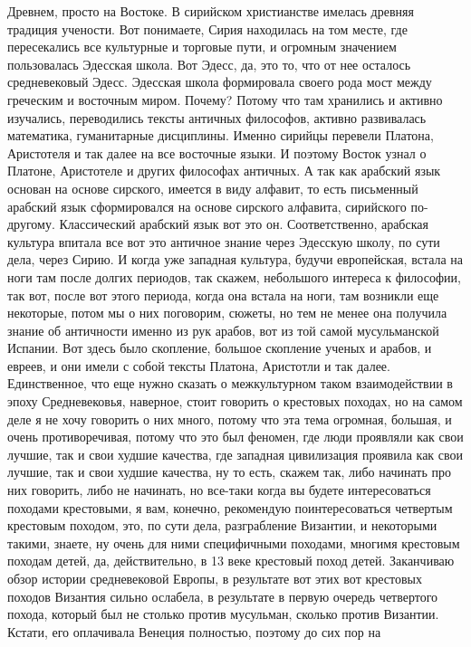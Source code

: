 Древнем, просто на Востоке. В сирийском христианстве имелась древняя традиция
учености. Вот понимаете, Сирия находилась на том месте, где пересекались все
культурные и торговые пути, и огромным значением пользовалась Эдесская школа.
Вот Эдесс, да, это то, что от нее осталось средневековый Эдесс. Эдесская школа
формировала своего рода мост между греческим и восточным миром. Почему? Потому
что там хранились и активно изучались, переводились тексты античных философов,
активно развивалась математика, гуманитарные дисциплины. Именно сирийцы перевели
Платона, Аристотеля и так далее на все восточные языки. И поэтому Восток узнал о
Платоне, Аристотеле и других философах античных. А так как арабский язык основан
на основе сирского, имеется в виду алфавит, то есть письменный арабский язык
сформировался на основе сирского алфавита, сирийского по-другому. Классический
арабский язык вот это он. Соответственно, арабская культура впитала все вот это
античное знание через Эдесскую школу, по сути дела, через Сирию. И когда уже
западная культура, будучи европейская, встала на ноги там после долгих периодов,
так скажем, небольшого интереса к философии, так вот, после вот этого периода,
когда она встала на ноги, там возникли еще некоторые, потом мы о них поговорим,
сюжеты, но тем не менее она получила знание об античности именно из рук арабов,
вот из той самой мусульманской Испании. Вот здесь было скопление, большое
скопление ученых и арабов, и евреев, и они имели с собой тексты Платона,
Аристотли и так далее. Единственное, что еще нужно сказать о межкультурном таком
взаимодействии в эпоху Средневековья, наверное, стоит говорить о крестовых
походах, но на самом деле я не хочу говорить о них много, потому что эта тема
огромная, большая, и очень противоречивая, потому что это был феномен, где люди
проявляли как свои лучшие, так и свои худшие качества, где западная цивилизация
проявила как свои лучшие, так и свои худшие качества, ну то есть, скажем так,
либо начинать про них говорить, либо не начинать, но все-таки когда вы будете
интересоваться походами крестовыми, я вам, конечно, рекомендую поинтересоваться
четвертым крестовым походом, это, по сути дела, разграбление Византии, и
некоторыми такими, знаете, ну очень для ними специфичными походами, многимя
крестовым походам детей, да, действительно, в 13 веке крестовый поход детей.
Заканчиваю обзор истории средневековой Европы, в результате вот этих вот
крестовых походов Византия сильно ослабела, в результате в первую очередь
четвертого похода, который был не столько против мусульман, сколько против
Византии. Кстати, его оплачивала Венеция полностью, поэтому до сих пор на
